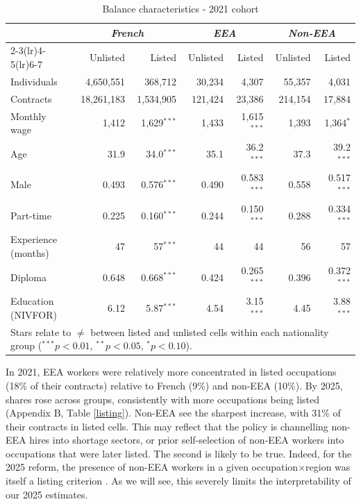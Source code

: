 \documentclass[10pt, a4paper]{article}
\begin{document}
\begin{table}[h]
\caption{Balance characteristics - 2021 cohort}
\vspace{0.3cm}
\label{tab:balance_2021}
\centering
\setlength{\tabcolsep}{11pt}
\begin{tabular}{lrrrrrr}
 & \multicolumn{2}{c}{\textit{French}} & \multicolumn{2}{c}{\textit{EEA}} & \multicolumn{2}{c}{\textit{Non-EEA}} \\
\cmidrule(lr){2-3}\cmidrule(lr){4-5}\cmidrule(lr){6-7}
 & Unlisted & Listed & Unlisted & Listed & Unlisted & Listed \\
\midrule
\midrule
Individuals & 4{,}650{,}551 & 368{,}712 & 30{,}234 & 4{,}307 & 55{,}357 & 4{,}031 \\
Contracts   & 18{,}261{,}183 & 1{,}534{,}905 & 121{,}424 & 23{,}386 & 214{,}154 & 17{,}884 \\
\midrule
Monthly wage & 1{,}412 & 1{,}629$^{***}$ & 1{,}433 & 1{,}615$^{***}$ & 1{,}393 & 1{,}364$^{*}$ \\
Age                 & 31.9 & 34.0$^{***}$ & 35.1 & 36.2$^{***}$ & 37.3 & 39.2$^{***}$ \\
Male                & 0.493 & 0.576$^{***}$ & 0.490 & 0.583$^{***}$ & 0.558 & 0.517$^{***}$ \\
Part-time           & 0.225 & 0.160$^{***}$ & 0.244 & 0.150$^{***}$ & 0.288 & 0.334$^{***}$ \\
Experience (months) & 47    & 57$^{***}$    & 44    & 44            & 56    & 57 \\
Diploma         & 0.648 & 0.668$^{***}$ & 0.424 & 0.265$^{***}$ & 0.396 & 0.372$^{***}$ \\
Education (NIVFOR)  & 6.12  & 5.87$^{***}$  & 4.54  & 3.15$^{***}$  & 4.45  & 3.88$^{***}$ \\
\bottomrule
\multicolumn{7}{p{0.95\linewidth}}{\footnotesize Stars relate to $\neq$ between
listed and unlisted cells within each nationality group ($^{***}p<0.01$, $^{**}p<0.05$, $^{*}p<0.10$).}\\
\end{tabular}
\end{table}
\FloatBarrier

\noindent In 2021, EEA workers were relatively more concentrated in listed occupations (18\% of their contracts) relative to French (9\%) and non-EEA (10\%). By 2025, shares rose across groups, consistently with more occupations being listed (Appendix B, Table \ref{listing}). Non-EEA see the sharpest increase, with 31\% of their contracts in listed cells. This may reflect that the policy is channelling non-EEA hires into shortage sectors, or prior self-selection of non-EEA workers into occupations that were later listed. The second is likely to be true. Indeed, for the 2025 reform, the presence of non-EEA workers in a given occupation$\times$region was itself a listing criterion \citep{ParFr2025}. As we will see, this severely limits the interpretability of our 2025 estimates.
\medskip
\end{document}
